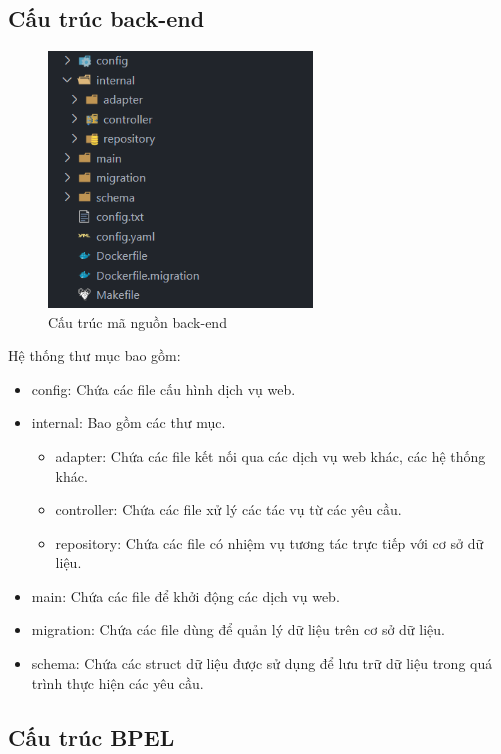 \subsection{Cấu trúc back-end}
\begin{figure}[!htp]
    \begin{center}
        \includegraphics[width=7cm]{img/file-structure/back-end.png}
    \end{center}
    \caption{Cấu trúc mã nguồn back-end}
\end{figure}

Hệ thống thư mục bao gồm:
\begin{itemize}
    \item config: Chứa các file cấu hình dịch vụ web.
    \item internal: Bao gồm các thư mục.
          \begin{itemize}
              \item adapter: Chứa các file kết nối qua các dịch vụ web khác, các hệ thống khác.
              \item controller: Chứa các file xử lý các tác vụ từ các yêu cầu.
              \item repository: Chứa các file có nhiệm vụ tương tác trực tiếp với cơ sở dữ liệu.
          \end{itemize}
    \item main: Chứa các file để khởi động các dịch vụ web.
    \item migration: Chứa các file dùng để quản lý dữ liệu trên cơ sở dữ liệu.
    \item schema: Chứa các struct dữ liệu được sử dụng để lưu trữ dữ liệu trong quá trình thực hiện các yêu cầu.
\end{itemize}

\subsection{Cấu trúc BPEL}

